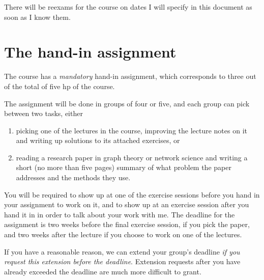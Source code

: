 \documentclass{tufte-handout}
\begin{document}
There will be reexams for the course on dates I will specify in this document as soon as I know them.

\section{The hand-in assignment}

The course has a \emph{mandatory} hand-in assignment, which corresponds to three out of the total of five hp of the course.

The assignment will be done in groups of four or five, and each group can pick between two tasks, either
\begin{enumerate}
  \item picking one of the lectures in the course, improving the lecture notes on it and writing up solutions to its attached exercises, or
  \item reading a research paper in graph theory or network science and writing a short (no more than five pages) summary of what problem the paper addresses and the methods they use.
\end{enumerate}

You will be required to show up at one of the exercise sessions before you hand in your assignment to work on it, and to show up at an exercise session after you hand it in in order to talk about your work with me. The deadline for the assignment is two weeks before the final exercise session, if you pick the paper, and two weeks after the lecture if you choose to work on one of the lectures.

If you have a reasonable reason, we can extend your group's deadline \emph{if you request this extension before the deadline}. Extension requests after you have already exceeded the deadline are much more difficult to grant.



\end{document}
